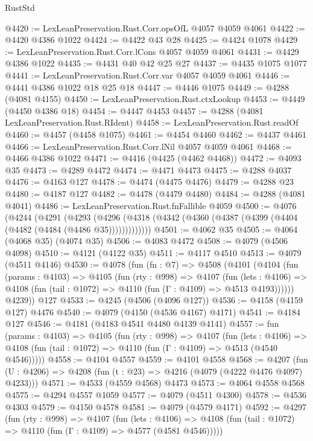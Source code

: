 \begin{lexlean}{RustStd}
\begin{coremodule}
{\begin{coremodule}
{{{{{{{{{{{{{{@4420 := LexLeanPreservation.Rust.Corr.opsOfL @4057 @4059 @4061
@4422 := @4420 @4386 @1022
@4424 := @4422 @43 @28
@4425 := @4424 @1078
@4429 := LexLeanPreservation.Rust.Corr.lCons @4057 @4059 @4061
@4431 := @4429 @4386 @1022
@4435 := @4431 @40 @42 @25 @27
@4437 := @4435 @1075 @1077
@4441 := LexLeanPreservation.Rust.Corr.var @4057 @4059 @4061
@4446 := @4441 @4386 @1022 @18 @25 @18
@4447 := @4446 @1075
@4449 := @4288 (@4081 @4155)
@4450 := LexLeanPreservation.Rust.ctxLookup
@4453 := @4449 (@4450 @4386 @18)
@4454 := @4447 @4453
@4457 := @4288 (@4081 LexLeanPreservation.Rust.RIdent)
@4458 := LexLeanPreservation.Rust.readOf
@4460 := @4457 (@4458 @1075)
@4461 := @4454 @4460
@4462 := @4437 @4461
@4466 := LexLeanPreservation.Rust.Corr.lNil @4057 @4059 @4061
@4468 := @4466 @4386 @1022
@4471 := @4416 (@4425 (@4462 @4468))
@4472 := @4093 @35
@4473 := @4289 @4472
@4474 := @4471 @4473
@4475 := @4288 @4037
@4476 := @4163 @127
@4478 := @4474 (@4475 @4476)
@4479 := @4288 @23
@4480 := @4187 @127
@4482 := @4478 (@4479 @4480)
@4484 := @4288 (@4081 @4041)
@4486 := LexLeanPreservation.Rust.fnFallible @4059
@4500 := @4076
    (@4244
      (@4291
        (@4293
          (@4296 (@4318 (@4342 (@4360 (@4387 (@4399 (@4404 (@4482 (@4484 (@4486 @35)))))))))))))
@4501 := @4062 @35
@4505 := @4064 (@4068 @35) (@4074 @35)
@4506 := @4083 @4472
@4508 := @4079 (@4506 @4098)
@4510 := @4121 (@4122 @35)
@4511 := @4117 @4510
@4513 := @4079 (@4511 @4146)
@4530 := @4078
    (fun (fn : @7) =>
    @4508
      (@4101
        (@4104
          (fun (params : @4103) =>
          @4105
            (fun (rty : @998) =>
            @4107
              (fun (lets : @4106) =>
              @4108 (fun (tail : @1072) => @4110 (fun (Γ : @4109) => @4513 @4193))))))
        @4239))
    @127
@4533 := @4245 (@4506 (@4096 @127))
@4536 := @4158 (@4159 @127) @4476
@4540 := @4079 (@4150 (@4536 @4167) @4171)
@4541 := @4184 @127
@4546 := @4181 (@4183 @4541 @4480 @4139 @4141)
@4557 := fun (params : @4103) =>
  @4105
    (fun (rty : @998) =>
    @4107
      (fun (lets : @4106) =>
      @4108 (fun (tail : @1072) => @4110 (fun (Γ : @4109) => @4513 (@4540 @4546)))))
@4558 := @4104 @4557
@4559 := @4101 @4558
@4568 := @4207 (fun (U : @4206) => @4208 (fun (t : @23) => @4216 (@4079 (@4222 @4476 @4097) @4233)))
@4571 := @4533 (@4559 @4568) @4473
@4573 := @4064 @4558 @4568
@4575 := @4294 @4557 @1059
@4577 := @4079 (@4511 @4300)
@4578 := @4536 @4303
@4579 := @4150 @4578
@4581 := @4079 (@4579 @4171)
@4592 := @4297
    (fun (rty : @998) =>
    @4107
      (fun (lets : @4106) =>
      @4108 (fun (tail : @1072) => @4110 (fun (Γ : @4109) => @4577 (@4581 @4546)))))
}}}}}}}}}}}}}}
\end{coremodule}}
\end{coremodule}
\end{lexlean}
